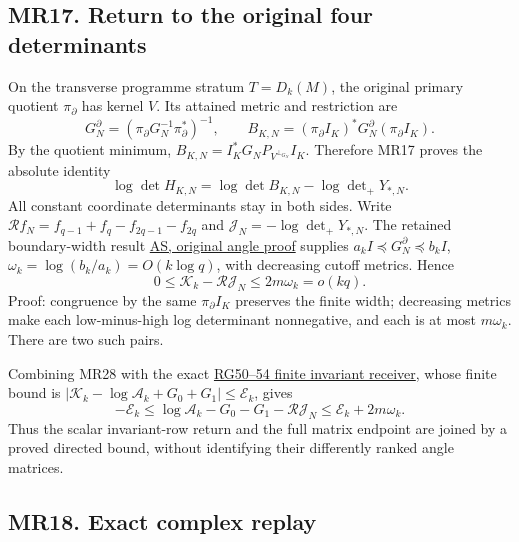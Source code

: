 \documentclass[11pt]{article}
\begin{document}
\subsection{MR17. Return to the original four determinants}\label{mr17.-return-to-the-original-four-determinants}

On the transverse programme stratum \(T=D_k(M)\), the original primary quotient \(\pi_\partial\) has kernel \(V\). Its attained metric and restriction are \[
 G_N^\partial=(\pi_\partial G_N^{-1}\pi_\partial^*)^{-1},\qquad
 B_{K,N}=(\pi_\partial I_K)^*G_N^\partial(\pi_\partial I_K).
\] By the quotient minimum, \(B_{K,N}=I_K^*G_NP_{V^{\perp_{G_N}}}I_K\). Therefore MR17 proves the absolute identity \[
 \boxed{\log\det H_{K,N}
 =\log\det B_{K,N}-\log\det\nolimits_+Y_{*,N}.}
\tag{MR27}
\] All constant coordinate determinants stay in both sides. Write \(\mathcal R f_N=f_{q-1}+f_q-f_{2q-1}-f_{2q}\) and \(\mathcal J_N=-\log\det_+Y_{*,N}\). The retained boundary-width result \href{https://github.com/KokunoYumeto/zeta-function-research-reader/blob/9b7b0bad40b33dc88bba7d8cb1548da1fadbb585/workbenches/splitzero-tandem/continuations/20260921-original-angle-word/ANGLE_PROOFS.md}{AS, original angle proof} supplies \(a_kI\preceq G_N^\partial\preceq b_kI\), \(\omega_k=\log(b_k/a_k)=O(k\log q)\), with decreasing cutoff metrics. Hence \[
 \boxed{0\le\mathcal K_k-\mathcal R\mathcal J_N
 \le2m\omega_k=o(kq).}
\tag{MR28}
\] Proof: congruence by the same \(\pi_\partial I_K\) preserves the finite width; decreasing metrics make each low-minus-high log determinant nonnegative, and each is at most \(m\omega_k\). There are two such pairs.

Combining MR28 with the exact \href{https://github.com/KokunoYumeto/zeta-function-research-reader/blob/13ca9b136fcdae48df7454bd9bf99e1ef22dd03c/workbenches/splitzero-tandem/continuations/20260922-original-growth-resolvent/GROWTH_PROOFS.md}{RG50--54 finite invariant receiver}, whose finite bound is \(|\mathcal K_k-\log\mathcal A_k+G_0+G_1|\le\mathcal E_k\), gives \[
 -\mathcal E_k\le
 \log\mathcal A_k-G_0-G_1-\mathcal R\mathcal J_N
 \le\mathcal E_k+2m\omega_k.
\tag{MR29}
\] Thus the scalar invariant-row return and the full matrix endpoint are joined by a proved directed bound, without identifying their differently ranked angle matrices.

\subsection{MR18. Exact complex replay}\label{mr18.-exact-complex-replay}
\end{document}

